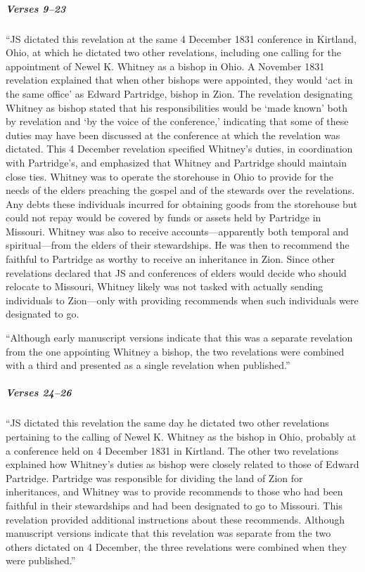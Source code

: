 			\subparagraph{Verses 9--23}
			
				``JS dictated this revelation at the same 4 December 1831 conference in Kirtland, Ohio, at which he dictated two other revelations, including one calling for the appointment of Newel K. Whitney as a bishop in Ohio. A November 1831 revelation explained that when other bishops were appointed, they would `act in the same office' as Edward Partridge, bishop in Zion. The revelation designating Whitney as bishop stated that his responsibilities would be `made known' both by revelation and `by the voice of the conference,' indicating that some of these duties may have been discussed at the conference at which the revelation was dictated. This 4 December revelation specified Whitney's duties, in coordination with Partridge's, and emphasized that Whitney and Partridge should maintain close ties. Whitney was to operate the storehouse in Ohio to provide for the needs of the elders preaching the gospel and of the stewards over the revelations. Any debts these individuals incurred for obtaining goods from the storehouse but could not repay would be covered by funds or assets held by Partridge in Missouri. Whitney was also to receive accounts---apparently both temporal and spiritual---from the elders of their stewardships. He was then to recommend the faithful to Partridge as worthy to receive an inheritance in Zion. Since other revelations declared that JS and conferences of elders would decide who should relocate to Missouri, Whitney likely was not tasked with actually sending individuals to Zion---only with providing recommends when such individuals were designated to go.
				
				``Although early manuscript versions indicate that this was a separate revelation from the one appointing Whitney a bishop, the two revelations were combined with a third and presented as a single revelation when published.''
			
			\subparagraph{Verses 24--26}
			
				``JS dictated this revelation the same day he dictated two other revelations pertaining to the calling of Newel K. Whitney as the bishop in Ohio, probably at a conference held on 4 December 1831 in Kirtland. The other two revelations explained how Whitney's duties as bishop were closely related to those of Edward Partridge. Partridge was responsible for dividing the land of Zion for inheritances, and Whitney was to provide recommends to those who had been faithful in their stewardships and had been designated to go to Missouri. This revelation provided additional instructions about these recommends. Although manuscript versions indicate that this revelation was separate from the two others dictated on 4 December, the three revelations were combined when they were published.''
			
